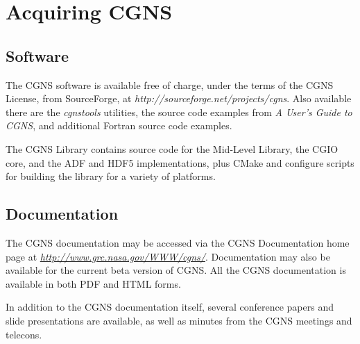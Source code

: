 \section{Acquiring CGNS}
\label{s:acquiring}
\thispagestyle{plain}

\subsection{Software}

The CGNS software is available free of charge, under the terms of the
CGNS License, from SourceForge, at
\textit{http://sourceforge.net/projects/cgns}.
Also available there are the \textit{cgnstools} utilities, the source
code examples from \textit{A User's Guide to CGNS}, and additional
Fortran source code examples.

The CGNS Library contains source code for the Mid-Level Library,
the CGIO core, and the ADF and HDF5 implementations,
plus CMake and configure scripts for building the
library for a variety of platforms.

\subsection{Documentation}

The CGNS documentation may be accessed via the CGNS Documentation home
page at {\itshape\url{http://www.grc.nasa.gov/WWW/cgns/}}.
Documentation may also be available for the current beta version of CGNS.
All the CGNS documentation is available in both PDF and HTML forms.

In addition to the CGNS documentation itself, several conference papers
and slide presentations are available, as well as minutes from the CGNS
meetings and telecons.
